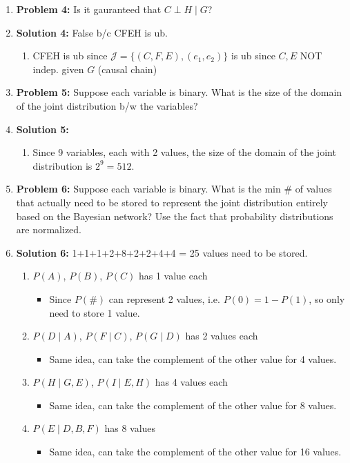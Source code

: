 \begin{example}
\begin{enumerate}
        \item \textbf{Problem 4:} Is it gauranteed that $C \perp H \mid G$?
        \item \textbf{Solution 4:} False b/c CFEH is ub.
        \begin{enumerate}
            \item CFEH is ub since $\mathcal{J} = \{(C,F,E),(e_1,e_2)\}$ is ub since $C,E$ NOT indep. given $G$ (causal chain)
        \end{enumerate}
        \item \textbf{Problem 5:} Suppose each variable is binary. What is the size of the domain of the joint distribution b/w the variables?
        \item \textbf{Solution 5:}
        \begin{enumerate}
            \item Since 9 variables, each with 2 values, the size of the domain of the joint distribution is $2^9 = 512$.
        \end{enumerate}
        \item \textbf{Problem 6:} Suppose each variable is binary. What is the min \# of values that actually need to be stored to represent the joint distribution entirely based on the Bayesian network? Use the fact that probability distributions are normalized.
        \item \textbf{Solution 6:} 1+1+1+2+8+2+2+4+4 = 25 values need to be stored.
        \begin{enumerate}
            \item $P(A)$, $P(B)$, $P(C)$ has 1 value each 
            \begin{itemize}
                \item Since $P(\#)$ can represent 2 values, i.e. $P(0) = 1-P(1)$, so only need to store 1 value.
            \end{itemize}
            \item $P(D \mid A)$, $P(F \mid C)$, $P(G \mid D)$ has 2 values each
            \begin{itemize}
                \item Same idea, can take the complement of the other value for 4 values.
            \end{itemize}
            \item $P(H \mid G,E)$, $P(I \mid E,H)$ has 4 values each
            \begin{itemize}
                \item Same idea, can take the complement of the other value for 8 values.
            \end{itemize}
            \item $P(E \mid D,B,F)$ has 8 values 
            \begin{itemize}
                \item Same idea, can take the complement of the other value for 16 values.
            \end{itemize}
        \end{enumerate}
    \end{enumerate}
\end{example}

